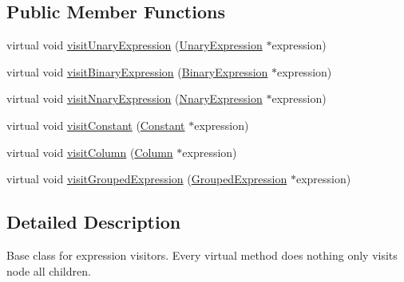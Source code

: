 \subsection*{Public Member Functions}
\begin{DoxyCompactItemize}
\item 
virtual void \hyperlink{classrafe_1_1_expression_visitor_base_a439348ee979dff26c30707f1ef499e8c}{visit\+Unary\+Expression} (\hyperlink{classrafe_1_1_unary_expression}{Unary\+Expression} $\ast$expression)
\item 
virtual void \hyperlink{classrafe_1_1_expression_visitor_base_a63e53276af3a22d3592f34d05ba97014}{visit\+Binary\+Expression} (\hyperlink{classrafe_1_1_binary_expression}{Binary\+Expression} $\ast$expression)
\item 
virtual void \hyperlink{classrafe_1_1_expression_visitor_base_a32f89977f780ccb8aabe5afa1fa42d45}{visit\+Nnary\+Expression} (\hyperlink{classrafe_1_1_nnary_expression}{Nnary\+Expression} $\ast$expression)
\item 
virtual void \hyperlink{classrafe_1_1_expression_visitor_base_af934111c6881f9f6c3ef3aa51425b9ff}{visit\+Constant} (\hyperlink{classrafe_1_1_constant}{Constant} $\ast$expression)
\item 
virtual void \hyperlink{classrafe_1_1_expression_visitor_base_a4eaa77bf4105d1cbdde4feb047228255}{visit\+Column} (\hyperlink{classrafe_1_1_column}{Column} $\ast$expression)
\item 
virtual void \hyperlink{classrafe_1_1_expression_visitor_base_a76226ab9d571ed7eaf80d2ed7153791c}{visit\+Grouped\+Expression} (\hyperlink{classrafe_1_1_grouped_expression}{Grouped\+Expression} $\ast$expression)
\end{DoxyCompactItemize}


\subsection{Detailed Description}
Base class for expression visitors. Every virtual method does nothing only visits node all children. 

